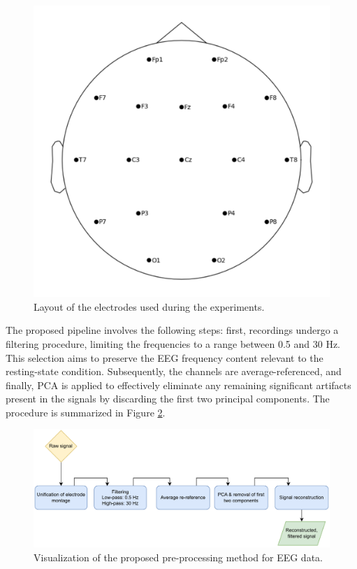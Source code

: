 \documentclass[a4paper,fleqn]{cas-sc}
\begin{document}
\begin{figure}[b]
    \centering
    \includegraphics[scale=0.4]{figures/electrodes.pdf}
    \caption{Layout of the electrodes used during the experiments.}
    \label{fig:ch-layout}
\end{figure}

The proposed pipeline involves the following steps: first, recordings undergo a filtering procedure, limiting the frequencies to a range between 0.5 and 30 Hz. This selection aims to preserve the EEG frequency content relevant to the resting-state condition. Subsequently, the channels are average-referenced, and finally, PCA is applied to effectively eliminate any remaining significant artifacts present in the signals by discarding the first two principal components. The procedure is summarized in Figure \ref{fig:proposed-filtering}.

\begin{figure}
    \centering
    \includegraphics[scale=0.8]{figures/prepro-steps.pdf}
    \caption{Visualization of the proposed pre-processing method for EEG data.}
    \label{fig:proposed-filtering}
\end{figure}
\end{document}

